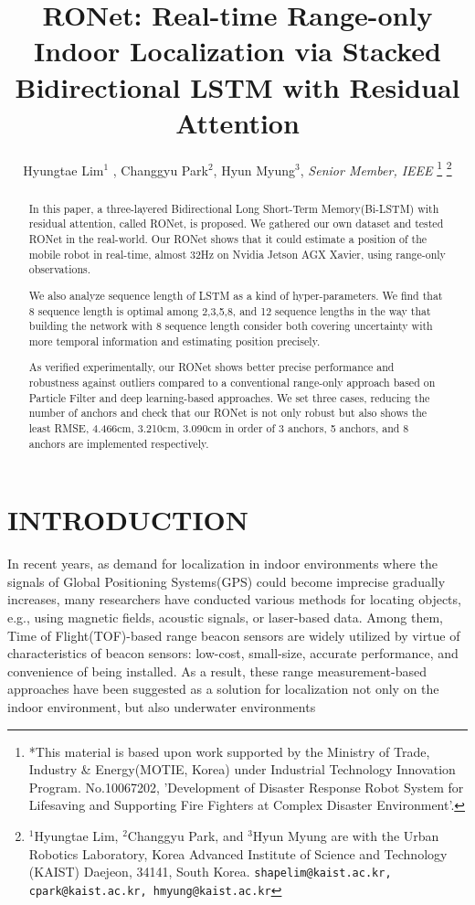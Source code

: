 \documentclass[letterpaper, 10 pt, conference]{ieeeconf}  %
\title{\LARGE \bf
RONet: Real-time Range-only Indoor Localization via Stacked Bidirectional LSTM with Residual Attention}
\author{Hyungtae Lim$^{1}$ , Changgyu Park$^{2}$, Hyun Myung$^{3}$, \textit{Senior Member, IEEE}%
\thanks{
	*This material is based upon work supported by the Ministry of Trade, Industry \& Energy(MOTIE, Korea) under Industrial Technology Innovation Program. No.10067202, 'Development of Disaster Response Robot System for Lifesaving and Supporting Fire Fighters at Complex Disaster Environment'.}%
\thanks{$^{1}$Hyungtae Lim, $^{2}$Changgyu Park, and $^{3}$Hyun Myung are with
	the Urban Robotics Laboratory, Korea Advanced Institute of Science
	and Technology (KAIST) Daejeon, 34141, South Korea. {\tt\small shapelim@kaist.ac.kr, cpark@kaist.ac.kr, hmyung@kaist.ac.kr}}%
%
}
\begin{document}


\maketitle
\thispagestyle{empty}
\pagestyle{empty}


\begin{abstract}


In this paper, a three-layered Bidirectional Long Short-Term Memory(Bi-LSTM) with residual attention, called RONet, is proposed. We gathered our own dataset and tested RONet in the real-world. Our RONet shows that it could estimate a position of the mobile robot in real-time, almost 32Hz on Nvidia Jetson AGX Xavier, using range-only observations.
 
 We also analyze sequence length of LSTM as a kind of hyper-parameters. We find that 8 sequence length is optimal among 2,3,5,8, and 12 sequence lengths in the way that building the network with 8 sequence length consider both covering uncertainty with more temporal information and estimating position precisely.

As verified experimentally, our RONet shows better precise performance  and robustness against outliers compared to a conventional range-only approach based on Particle Filter and deep learning-based approaches. We set three cases, reducing the number of anchors and check that our RONet is not only robust but also shows the least RMSE, 4.466cm, 3.210cm, 3.090cm in order of 3 anchors, 5 anchors, and 8 anchors are implemented respectively.   

\end{abstract}


\section{INTRODUCTION}

In recent years, as demand for localization in indoor environments where the signals of Global Positioning Systems(GPS) could become imprecise gradually increases, many researchers have conducted various methods for locating objects, e.g., using magnetic fields, acoustic signals, or laser-based data. Among them, Time of Flight(TOF)-based range beacon sensors are widely utilized by virtue of characteristics of beacon sensors: low-cost, small-size, accurate performance, and convenience of being installed. As a result, these range measurement-based approaches have been suggested as a solution for localization  not only on the indoor environment\cite{peneda2009trilateration, jung2011indoor}, but also underwater environments\cite{newman2003pure, olson2006robust}
 
\end{document}
